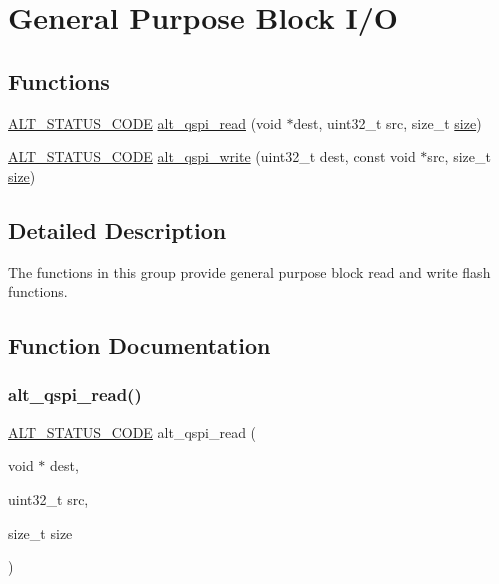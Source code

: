 \hypertarget{group__ALT__QSPI__GP__BLKIO}{}\section{General Purpose Block I/O}
\label{group__ALT__QSPI__GP__BLKIO}
\subsection*{Functions}
\begin{DoxyCompactItemize}
\item 
\mbox{\hyperlink{hwlib_8h_abdb0d369f069723ca55d6c94bcaaaa12}{A\+L\+T\+\_\+\+S\+T\+A\+T\+U\+S\+\_\+\+C\+O\+DE}} \mbox{\hyperlink{group__ALT__QSPI__GP__BLKIO_gab2b8361bcea883e886d7cc7feada314e}{alt\+\_\+qspi\+\_\+read}} (void $\ast$dest, uint32\+\_\+t src, size\+\_\+t \mbox{\hyperlink{sun4u_2tte_8h_a245260f6f74972558f61b85227df5aae}{size}})
\item 
\mbox{\hyperlink{hwlib_8h_abdb0d369f069723ca55d6c94bcaaaa12}{A\+L\+T\+\_\+\+S\+T\+A\+T\+U\+S\+\_\+\+C\+O\+DE}} \mbox{\hyperlink{group__ALT__QSPI__GP__BLKIO_ga5b54d580ee87bf243f6b7d57f8740ef9}{alt\+\_\+qspi\+\_\+write}} (uint32\+\_\+t dest, const void $\ast$src, size\+\_\+t \mbox{\hyperlink{sun4u_2tte_8h_a245260f6f74972558f61b85227df5aae}{size}})
\end{DoxyCompactItemize}


\subsection{Detailed Description}
The functions in this group provide general purpose block read and write flash functions. 

\subsection{Function Documentation}
\mbox{\label{group__ALT__QSPI__GP__BLKIO_gab2b8361bcea883e886d7cc7feada314e}} 
\subsubsection{\texorpdfstring{alt\_qspi\_read()}{alt\_qspi\_read()}}
{\footnotesize\ttfamily \mbox{\hyperlink{hwlib_8h_abdb0d369f069723ca55d6c94bcaaaa12}{A\+L\+T\+\_\+\+S\+T\+A\+T\+U\+S\+\_\+\+C\+O\+DE}} alt\+\_\+qspi\+\_\+read (\begin{DoxyParamCaption}\item[{void $\ast$}]{dest,  }\item[{uint32\+\_\+t}]{src,  }\item[{size\+\_\+t}]{size }\end{DoxyParamCaption})}

